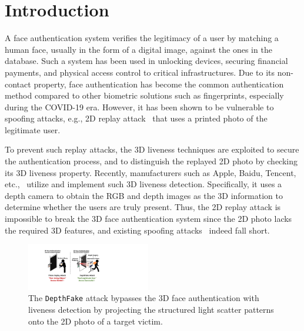 \section{Introduction}
A face authentication system verifies the legitimacy of a user by matching a human face, usually in the form of a digital image, against the ones in the database. Such a system has been used in unlocking devices, securing financial payments, and physical access control to critical infrastructures. Due to its non-contact property, face authentication has become the common authentication method compared to other biometric solutions such as fingerprints, especially during the COVID-19 era. However, it has been shown to be vulnerable to spoofing attacks, e.g., 2D replay attack~\cite{chakka2011competition,anjos2011counter,raghavendra2015presentation} that uses a printed photo of the legitimate user.


To prevent such replay attacks, the 3D liveness techniques are exploited to secure the authentication process, and to distinguish the replayed 2D photo by checking its 3D liveness property. Recently, manufacturers such as Apple, Baidu, Tencent, etc.,~\cite{faceid, baidu, tencent} utilize and implement such 3D liveness detection. 
Specifically, it uses a depth camera to obtain the RGB and depth images as the 3D information to determine whether the users are truly present. Thus, the 2D replay attack is impossible to break the 3D face authentication system since the 2D photo lacks the required 3D features, and existing spoofing attacks~\cite{souza2018far, marcel2014handbook} indeed fall short.

\begin{figure}[t]
	\centerline{\includegraphics[width = 0.48\textwidth]{figures/intro.pdf}}
	\vspace{-0.1in}
	\caption{The \texttt{DepthFake} attack bypasses the 3D face authentication with liveness detection by projecting the structured light scatter patterns onto the 2D photo of a target victim.}
	\label{intro}
	\vspace{-0.2in}
\end{figure}

